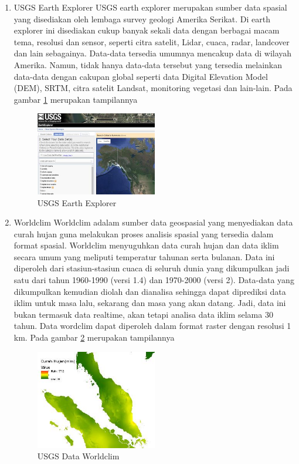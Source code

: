 \begin{enumerate}
\item USGS Earth Explorer
USGS earth explorer merupakan sumber data spasial yang disediakan oleh lembaga survey geologi Amerika Serikat. Di earth explorer ini disediakan cukup banyak sekali data dengan berbagai macam tema, resolusi dan sensor, seperti citra satelit, Lidar, cuaca, radar, landcover dan lain sebagainya. Data-data tersedia umumnya mencakup data di wilayah Amerika. Namun, tidak hanya data-data tersebut yang tersedia melainkan data-data dengan cakupan global seperti data Digital Elevation Model (DEM), SRTM, citra satelit Landsat, monitoring vegetasi dan lain-lain.  Pada gambar \ref{labelgambar2} merupakan tampilannya  
\begin{figure}[ht]
\centering
\includegraphics[width=0.5\textwidth]{pictures/usgs_earth_explorer}
\caption{USGS Earth Explorer}
\label{labelgambar2}
\end{figure}


\item Worldclim
Worldclim adalam sumber data geospasial yang menyediakan data curah hujan guna melakukan proses analisis spasial yang tersedia dalam format spasial. Worldclim menyuguhkan data curah hujan dan data iklim secara umum yang meliputi temperatur tahunan serta bulanan. Data ini diperoleh dari stasiun-stasiun cuaca di seluruh dunia yang dikumpulkan jadi satu dari tahun 1960-1990 (versi 1.4) dan 1970-2000 (versi 2). Data-data yang dikumpulkan kemudian diolah dan dianalisa sehingga dapat diprediksi data iklim untuk masa lalu, sekarang dan masa yang akan datang. Jadi, data ini bukan termasuk data realtime, akan tetapi analisa data iklim selama 30 tahun. Data wordclim dapat diperoleh dalam format raster dengan resolusi 1 km.  Pada gambar \ref{labelgambar3} merupakan tampilannya  

\begin{figure}[ht]
\centering
\includegraphics[width=0.5\textwidth]{pictures/data_worldclim}
\caption{USGS Data Worldclim}
\label{labelgambar3}
\end{figure}


\end{enumerate}
